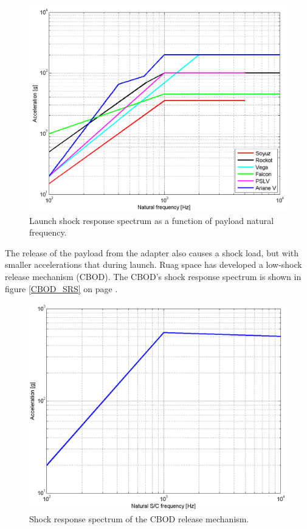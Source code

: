 \begin{figure}[ht!]
\centering
\includegraphics[width=1.0\textwidth, angle=0]{chapters/img/Shock_Loads_Acceleration.png}
\caption{Launch shock response spectrum as a function of payload natural frequency.}
\label{fig:SRS}
\end{figure}

The release of the payload from the adapter also causes a shock load, but with smaller accelerations that during launch. Ruag space has developed a low-shock release mechanism (CBOD). The CBOD's shock response spectrum is shown in figure \ref{CBOD_SRS} on page \pageref{CBOD_SRS}.

\begin{figure}[ht!]
\centering
\includegraphics[width=1.0\textwidth, angle=0]{chapters/img/CBOD_release_acceleration.png}
\caption{Shock response spectrum of the CBOD release mechanism.}
\label{fig:CBOD_SRS}
\end{figure}

